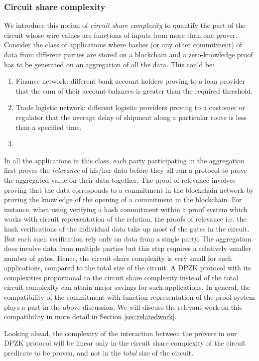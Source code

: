 \subsubsection{Circuit share complexity}
We introduce this notion of \textit{circuit share complexity} to quantify the part of the circuit whose wire values are functions of inputs from more than one prover. 
Consider the class of applications where hashes (or any other commitment) of data from different parties are stored on a blockchain and a zero-knowledge proof has to be generated on an aggregation of all the data. This could be: 
\begin{enumerate}
\item Finance network: different bank account holders proving to a loan provider that the sum of their account balances is greater than the required threshold.
\item Trade logistic network: different logistic providers proving to a customer or regulator that the average delay of shipment along a particular route is less than a specified time.
\item 
\end{enumerate}
In all the applications in this class, each party participating in the aggregation first proves the \textit{relevance} of his/her data before they all run a protocol to prove the aggregated value on their data together. The proof of relevance involves proving that the data corresponds to a commitment in the blockchain network by proving the knowledge of the opening of a commitment in the blockchain. 
For instance, when using verifying a hash commitment within a proof system which works with circuit representation of the relation, the proofs of relevance i.e. the hash verifications of the individual data take up most of the gates in the circuit. But each such verification rely only on data from a single party. The aggregation does involve data from multiple parties but this step requires a relatively smaller number of gates. Hence, the circuit share complexity is very small for such applications, compared to the total size of the circuit. A DPZK protocol with its complexities proportional to the circuit share complexity instead of the total circuit complexity can attain major savings for such applications.
In general, the compatibility of the commitment with function representation of the proof system plays a part in the above discussion. We will discuss the relevant work on this compatibility in more detail in Section \ref{sec:relatedwork}.

Looking ahead, the complexity of the interaction between the provers in our DPZK protocol will be linear only in the circuit share complexity of the circuit predicate to be proven, and not in the \textit{total} size of the circuit.
 
